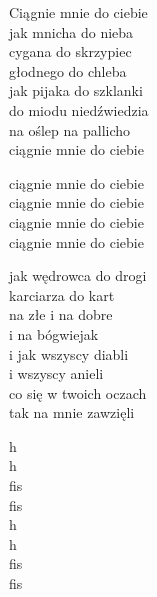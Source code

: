 \begin{text}
    Ciągnie mnie do ciebie\\
    jak mnicha do nieba\\
    cygana do skrzypiec\\
    głodnego do chleba\\
    jak pijaka do szklanki\\
    do miodu niedźwiedzia\\
    na oślep na pallicho\\
    ciągnie mnie do ciebie

    ciągnie mnie do ciebie\\
    ciągnie mnie do ciebie\\
    ciągnie mnie do ciebie\\
    ciągnie mnie do ciebie

    jak wędrowca do drogi\\
    karciarza do kart\\
    na złe i na dobre\\
    i na bógwiejak\\
    i jak wszyscy diabli\\
    i wszyscy anieli\\
    co się w twoich oczach\\
    tak na mnie zawzięli
\end{text}
\begin{chord}
    h\\
    h\\
    fis\\
    fis\\
    h\\
    h\\
    fis\\
    fis
\end{chord}